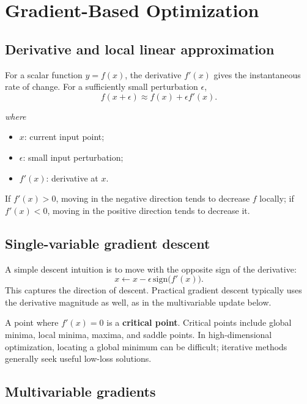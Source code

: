 \documentclass[11pt,a4paper]{report}
\newcommand{\wherelegend}{\par\smallskip\textit{where}\vspace{-0.3em}}
\begin{document}
\section{Gradient-Based Optimization}

\subsection{Derivative and local linear approximation}

For a scalar function $y=f(x)$, the derivative $f'(x)$ gives the instantaneous rate of change. For a sufficiently small perturbation $\epsilon$,
\begin{equation}
  f(x+\epsilon) \approx f(x) + \epsilon f'(x).
  \label{eq:first-order}
\end{equation}
\wherelegend
\begin{itemize}
  \item $x$: current input point;
  \item $\epsilon$: small input perturbation;
  \item $f'(x)$: derivative at $x$.
\end{itemize}
If $f'(x)>0$, moving in the negative direction tends to decrease $f$ locally; if $f'(x)<0$, moving in the positive direction tends to decrease it.

\subsection{Single-variable gradient descent}

A simple descent intuition is to move with the opposite sign of the derivative:
\begin{equation}
  x \leftarrow x - \epsilon\,\mathrm{sign}\bigl(f'(x)\bigr).
  \label{eq:sign-descent}
\end{equation}
This captures the direction of descent. Practical gradient descent typically uses the derivative magnitude as well, as in the multivariable update below.

A point where $f'(x)=0$ is a \textbf{critical point}. Critical points include global minima, local minima, maxima, and saddle points. In high-dimensional optimization, locating a global minimum can be difficult; iterative methods generally seek useful low-loss solutions.

\subsection{Multivariable gradients}
\end{document}

